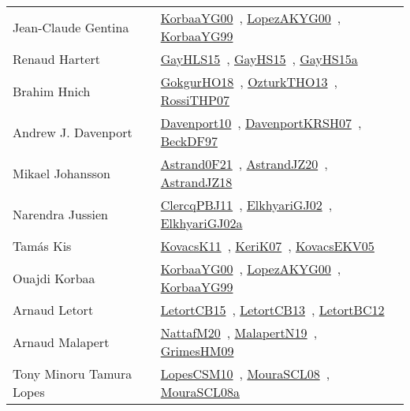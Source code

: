 {\begin{longtable}{p{4cm}p{20cm}}
Jean{-}Claude Gentina & \href{works/KorbaaYG00.pdf}{KorbaaYG00}~\cite{KorbaaYG00}, \href{works/LopezAKYG00.pdf}{LopezAKYG00}~\cite{LopezAKYG00}, \href{works/KorbaaYG99.pdf}{KorbaaYG99}~\cite{KorbaaYG99}\\
Renaud Hartert & \href{works/GayHLS15.pdf}{GayHLS15}~\cite{GayHLS15}, \href{works/GayHS15.pdf}{GayHS15}~\cite{GayHS15}, \href{works/GayHS15a.pdf}{GayHS15a}~\cite{GayHS15a}\\
Brahim Hnich & \href{works/GokgurHO18.pdf}{GokgurHO18}~\cite{GokgurHO18}, \href{works/OzturkTHO13.pdf}{OzturkTHO13}~\cite{OzturkTHO13}, \href{works/RossiTHP07.pdf}{RossiTHP07}~\cite{RossiTHP07}\\
Andrew J. Davenport & \href{works/Davenport10.pdf}{Davenport10}~\cite{Davenport10}, \href{works/DavenportKRSH07.pdf}{DavenportKRSH07}~\cite{DavenportKRSH07}, \href{works/BeckDF97.pdf}{BeckDF97}~\cite{BeckDF97}\\
Mikael Johansson & \href{works/Astrand0F21.pdf}{Astrand0F21}~\cite{Astrand0F21}, \href{works/AstrandJZ20.pdf}{AstrandJZ20}~\cite{AstrandJZ20}, \href{works/AstrandJZ18.pdf}{AstrandJZ18}~\cite{AstrandJZ18}\\
Narendra Jussien & \href{works/ClercqPBJ11.pdf}{ClercqPBJ11}~\cite{ClercqPBJ11}, \href{works/ElkhyariGJ02.pdf}{ElkhyariGJ02}~\cite{ElkhyariGJ02}, \href{works/ElkhyariGJ02a.pdf}{ElkhyariGJ02a}~\cite{ElkhyariGJ02a}\\
Tam{\'{a}}s Kis & \href{works/KovacsK11.pdf}{KovacsK11}~\cite{KovacsK11}, \href{works/KeriK07.pdf}{KeriK07}~\cite{KeriK07}, \href{works/KovacsEKV05.pdf}{KovacsEKV05}~\cite{KovacsEKV05}\\
Ouajdi Korbaa & \href{works/KorbaaYG00.pdf}{KorbaaYG00}~\cite{KorbaaYG00}, \href{works/LopezAKYG00.pdf}{LopezAKYG00}~\cite{LopezAKYG00}, \href{works/KorbaaYG99.pdf}{KorbaaYG99}~\cite{KorbaaYG99}\\
Arnaud Letort & \href{works/LetortCB15.pdf}{LetortCB15}~\cite{LetortCB15}, \href{works/LetortCB13.pdf}{LetortCB13}~\cite{LetortCB13}, \href{works/LetortBC12.pdf}{LetortBC12}~\cite{LetortBC12}\\
Arnaud Malapert & \href{works/NattafM20.pdf}{NattafM20}~\cite{NattafM20}, \href{works/MalapertN19.pdf}{MalapertN19}~\cite{MalapertN19}, \href{works/GrimesHM09.pdf}{GrimesHM09}~\cite{GrimesHM09}\\
Tony Minoru Tamura Lopes & \href{works/LopesCSM10.pdf}{LopesCSM10}~\cite{LopesCSM10}, \href{works/MouraSCL08.pdf}{MouraSCL08}~\cite{MouraSCL08}, \href{works/MouraSCL08a.pdf}{MouraSCL08a}~\cite{MouraSCL08a}\\

\end{longtable}}
